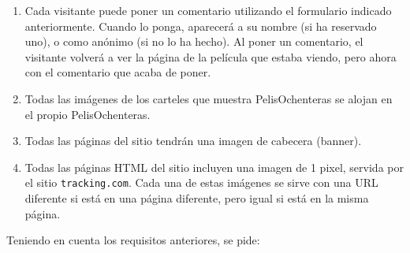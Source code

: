 \begin{enumerate}
\item Cada visitante puede poner un comentario utilizando el formulario indicado anteriormente. Cuando lo ponga, aparecerá a su nombre (si ha reservado uno), o como anónimo (si no lo ha hecho). Al poner un comentario, el visitante volverá a ver la página de la película que estaba viendo, pero ahora con el comentario que acaba de poner.
\item Todas las imágenes de los carteles que muestra PelisOchenteras se alojan en el propio PelisOchenteras.
\item Todas las páginas del sitio tendrán una imagen de cabecera (banner).
\item Todas las páginas HTML del sitio incluyen una imagen de 1 pixel, servida por el sitio \texttt{tracking.com}. Cada una de estas imágenes se sirve con una URL diferente si está en una página diferente, pero igual si está en la misma página.

\end{enumerate}


Teniendo en cuenta los requisitos anteriores, se pide:

